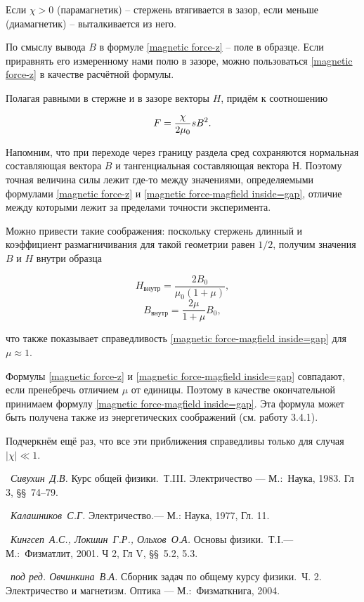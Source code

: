 Если $\chi > 0$ (парамагнетик) -- стержень втягивается в зазор, если меньше (диамагнетик) -- выталкивается из него.

По смыслу вывода $B$ в формуле \eqref{magnetic force-z} -- поле в образце. Если приравнять его измеренному нами полю в зазоре, можно пользоваться \eqref{magnetic force-z} в качестве расчётной формулы.

Полагая равными в стержне и в зазоре векторы $H$, придём к соотношению

\begin{equation}
	\eqmark{magnetic force-magfield inside gap}
	F = \frac{\chi}{2\mu_0} sB^2.
\end{equation}

Напомним, что при переходе через границу раздела сред сохраняются нормальная составляющая вектора $B$ и тангенциальная составляющая вектора $Н$. Поэтому точная величина силы лежит где-то между значениями, определяемыми формулами \eqref{magnetic force-z} и \eqref{magnetic force-magfield inside=gap}, отличие между которыми лежит за пределами точности эксперимента.

Можно привести такие соображения: поскольку стержень длинный и коэффициент размагничивания для такой геометрии равен $1/2$,  получим значения $B$ и $H$ внутри образца

\begin{equation*}
	H_{\text{внутр}} = \frac{2B_0}{\mu_0 (1 + \mu)},
\end{equation*}
\begin{equation*}
	B_{\text{внутр}} = \frac{2\mu}{1 + \mu} B_0,
\end{equation*}

что также показывает справедливость \eqref{magnetic force-magfield inside=gap} для $\mu \approx 1$.

Формулы \eqref{magnetic force-z} и \eqref{magnetic force-magfield inside=gap} совпадают, если пренебречь отличием $\mu$ от единицы. Поэтому в качестве окончательной принимаем формулу \eqref{magnetic force-magfield inside=gap}. Эта формула может быть получена также из энергетических соображений (см. работу 3.4.1).

Подчеркнём ещё раз, что все эти приближения справедливы только для случая $|\chi| \ll 1$.

\begin{lab:literature}
	\item~\emph{Сивухин~Д.В.} Курс общей физики.~Т.III. Электричество --- М.:~Наука, 1983. Гл 3, \S\S~74--79.
	\item~\emph{Калашников~С.Г.} Электричество.--- М.: Наука, 1977, Гл. 11.
	\item~\emph{Кингсеп~А.С., Локшин~Г.Р., Ольхов~О.А.} Основы физики.~Т.I.--- М.:~Физматлит, 2001. Ч 2, Гл V, \S\S~5.2, 5.3.
	\item~\emph{под ред. Овчинкина~В.А.} Сборник задач по общему курсу физики.~Ч. 2. Электричество и магнетизм. Оптика --- М.:~Физматкнига, 2004.
\end{lab:literature}

